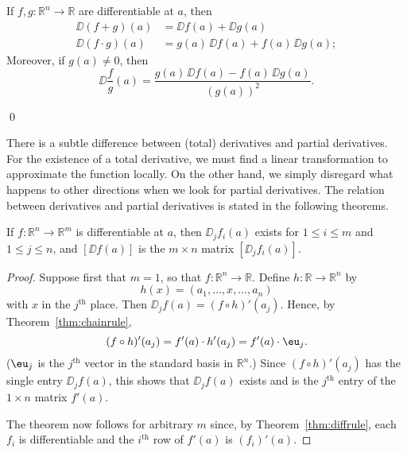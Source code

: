 \documentclass[11pt]{article}
\begin{document}
\begin{cor}
  If $f,g : \mathbb{R}^n \rightarrow \mathbb{R}$ are differentiable at $a$, then
  \begin{align*}
    \DD (f+g)(a) &= \DD f(a) + \DD g(a) \\
    \DD (f \cdot g)(a) &= g(a) \, \DD f(a) + f(a) \, \DD g(a);
  \end{align*}
  Moreover, if $g(a) \ne 0$, then
  \begin{equation*}
    \DD \frac{f}{g} (a) = \frac{g(a) \, \DD f(a) - f(a) \, \DD g(a)}{ (g(a))^2 }.
  \end{equation*}
\end{cor} \qed

\medskip

There is a subtle difference between (total) derivatives and partial
derivatives.  
For the existence of a total derivative, we must find a linear transformation to approximate the function locally.  
On the other hand, we simply disregard what happens to other directions when we look for partial derivatives.
The relation between derivatives and partial derivatives is stated in the following theorems.

\begin{thm}
  \label{thm:partialdiff}
  If $f: \mathbb{R}^n \rightarrow \mathbb{R}^m$ is differentiable at $a$, then
  $\DD_j f_i(a)$ exists for $1 \leqslant i \leqslant m$ and $1 \leqslant j \leqslant n$, and $[\DD f(a)]$ is the $m \times n$ matrix $[\DD_j f_i(a)]$.
\end{thm}

\begin{proof}
Suppose first that $m = 1$, so that $f: \mathbb{R}^n \rightarrow \mathbb{R}$.  Define $h : \mathbb{R} \rightarrow \mathbb{R}^n$ by 
\begin{equation*}
  h(x) = (a_1, \dots, x, \dots, a_n)
\end{equation*}
with $x$ in the $j^{\text{th}}$ place.  Then $\DD_j f(a) = (f \circ h)'(a_j)$.  
Hence, by Theorem~\ref{thm:chainrule},
\begin{equation*}
  (f \circ h)'(a_j) = f'(a) \cdot h'(a_j) = f'(a) \cdot \eu_j.
\end{equation*}
($\eu_j$ is the $j^{\text{th}}$ vector in the standard basis in $\mathbb{R}^n$.)  
Since $(f \circ h)'(a_j)$ has the single entry $\DD_j f(a)$, this shows that $\DD_j f(a)$ exists and is the $j^{\text{th}}$ entry of the $1 \times n$ matrix $f'(a)$.

The theorem now follows for arbitrary $m$ since, by
Theorem~\ref{thm:diffrule}, each $f_i$ is differentiable and the
$i^{\text{th}}$ row of $f'(a)$ is $(f_i)'(a)$.
\end{proof}
\end{document}
